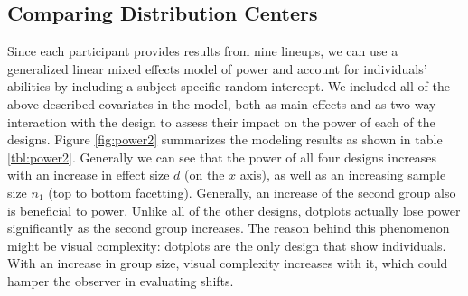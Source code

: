 \subsection{Comparing Distribution Centers}

Since each participant provides results from nine lineups, we can use a generalized linear mixed effects model of power and account for individuals' abilities by including a subject-specific random intercept. We included all of the above described covariates  in the model, both as main effects and as two-way interaction with the design to assess their impact on the power of each of the designs.
Figure \ref{fig:power2} summarizes the modeling results as shown in table \ref{tbl:power2}. Generally we can see that the power of all four designs increases with an increase in effect size $d$ (on the $x$ axis), as well as an increasing sample size $n_1$ (top to bottom facetting). Generally, an increase of the second group also is beneficial to power. Unlike all of the other designs,  dotplots actually lose power significantly as the second group increases. 
The reason behind this phenomenon might be visual complexity: dotplots are the only design that show individuals. With an increase in group size, visual complexity increases with it, which could hamper the observer in evaluating shifts.

